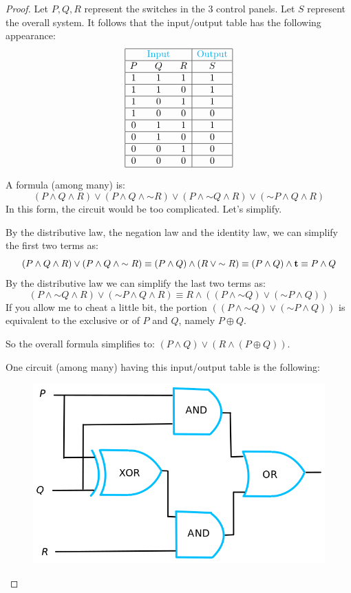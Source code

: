 \documentclass[14pt]{extarticle}
\newcommand{\true}{{\bf t}}
\begin{document}
\begin{proof}
Let $P, Q, R$ represent the switches in the 3 control panels. Let $S$ represent the overall system. It follows that the input/output table has the following appearance:
$$
\begin{array}{|ccc|c|}
\hline
& \color{cyan}\text{Input} & & \color{cyan}\text{Output} \\
\hline
P&Q&R&S\\
\hline
1&1&1&1\\
\hline
1&1&0&1\\
\hline
1&0&1&1\\
\hline
1&0&0&0\\
\hline
0&1&1&1\\
\hline
0&1&0&0\\
\hline
0&0&1&0\\
\hline
0&0&0&0\\
\hline
\end{array}
$$

A formula (among many) is:
$$
(P \wedge Q \wedge R) \vee (P \wedge Q \wedge {\sim R}) \vee (P \wedge {\sim Q} \wedge R) \vee ({\sim P} \wedge Q \wedge R)
$$
In this form, the circuit would be too complicated. Let's simplify.

By the distributive law, the negation law and the identity law, we can simplify the first two terms as:
$$
(P \wedge Q \wedge R) \vee (P \wedge Q \wedge {\sim R}) \equiv (P \wedge Q) \wedge (R \vee {\sim R}) \equiv (P \wedge Q) \wedge
\true \equiv P \wedge Q
$$
By the distributive law we can simplify the last two
terms as:
$$
(P \wedge {\sim Q} \wedge R) \vee ({\sim P} \wedge Q \wedge R)
\equiv R \wedge ((P \wedge {\sim Q}) \vee ({\sim P} \wedge Q))
$$
If you allow me to cheat a little bit, the portion $((P \wedge {\sim Q}) \vee ({\sim P} \wedge Q))$ is equivalent to the exclusive or of $P$ and $Q$, namely $P \oplus Q$.

So the overall formula simplifies to: $(P \wedge Q) \vee (R \wedge (P \oplus Q))$.

One circuit (among many) having this input/output table is the following:

\begin{figure}[ht!]
\centering
\includegraphics[scale=0.3]{../images/2.4.25.png}
\end{figure}
\end{proof}
\end{document}
